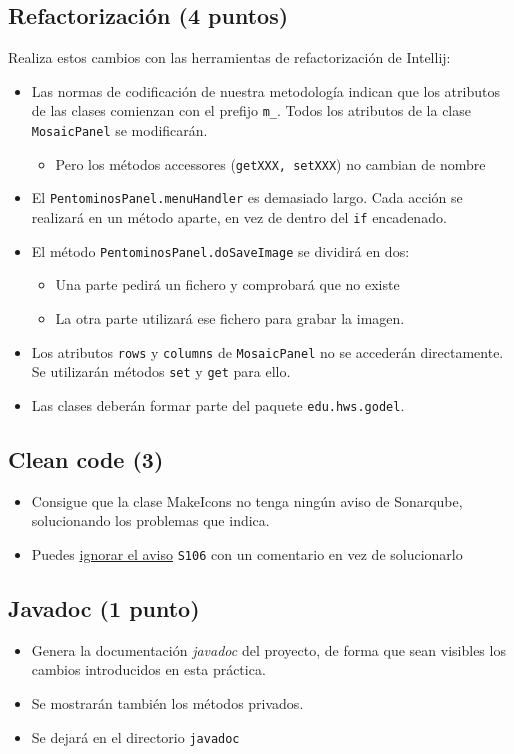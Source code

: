 \documentclass[a4paper]{article}
\begin{document}
\subsection{Refactorización (4 puntos)}
\label{sec:org0000006}
Realiza estos cambios con las herramientas de refactorización de Intellij:
\begin{itemize}
\item Las normas de codificación de nuestra metodología indican que los atributos de las clases comienzan con el prefijo \texttt{m\_}. Todos los atributos de la clase \texttt{MosaicPanel} se modificarán.
\begin{itemize}
\item Pero los métodos accessores (\texttt{getXXX, setXXX}) no cambian de nombre
\end{itemize}
\item El \texttt{PentominosPanel.menuHandler} es demasiado largo. Cada acción se realizará en un método aparte, en vez de dentro del \texttt{if} encadenado.
\item El método \texttt{PentominosPanel.doSaveImage} se dividirá en dos:
\begin{itemize}
\item Una parte pedirá un fichero y comprobará que no existe
\item La otra parte utilizará ese fichero para grabar la imagen.
\end{itemize}
\item Los atributos \texttt{rows} y \texttt{columns} de \texttt{MosaicPanel} no se accederán directamente. Se utilizarán métodos \texttt{set} y \texttt{get} para ello.
\item Las clases deberán formar parte del paquete \texttt{edu.hws.godel}.
\end{itemize}
\subsection{Clean code (3)}
\label{sec:org0000009}
\begin{itemize}
\item Consigue que la clase MakeIcons no tenga ningún aviso de Sonarqube, solucionando los problemas que indica.
\item Puedes \href{https://stackoverflow.com/questions/10971968/turning-sonar-off-for-certain-code}{ignorar el aviso} \texttt{S106} con un comentario en vez de solucionarlo
\end{itemize}
\subsection{Javadoc (1 punto)}
\label{sec:org000000c}
\begin{itemize}
\item Genera la documentación \emph{javadoc} del proyecto, de forma que sean visibles los cambios introducidos en esta práctica.
\item Se mostrarán también los métodos privados.
\item Se dejará en el directorio \texttt{javadoc}
\end{itemize}
\end{document}
